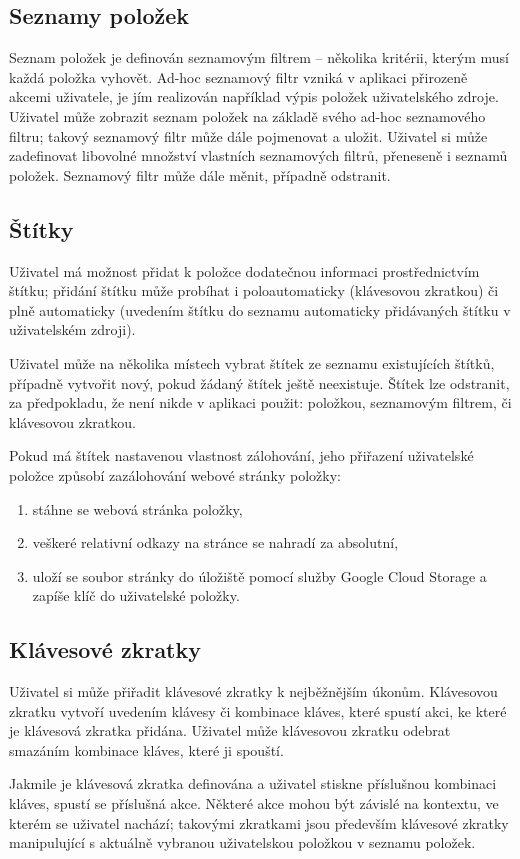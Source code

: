\subsection{Seznamy položek}

Seznam položek je definován seznamovým filtrem -- několika kritérii, kterým musí každá položka vyhovět.
Ad-hoc seznamový filtr vzniká v aplikaci přirozeně akcemi uživatele, je jím realizován například výpis položek uživatelského zdroje.
Uživatel může zobrazit seznam položek na základě svého ad-hoc seznamového filtru; takový seznamový filtr může dále pojmenovat a uložit.
Uživatel si může zadefinovat libovolné množství vlastních seznamových filtrů, přeneseně i seznamů položek.
Seznamový filtr může dále měnit, případně odstranit.

\subsection{Štítky}\label{ssec:procesy-stitky}

Uživatel má možnost přidat k položce dodatečnou informaci prostřednictvím štítku; přidání štítku může probíhat i poloautomaticky (klávesovou zkratkou) či plně automaticky (uvedením štítku do seznamu automaticky přidávaných štítku v uživatelském zdroji).

Uživatel může na několika místech vybrat štítek ze seznamu existujících štítků, případně vytvořit nový, pokud žádaný štítek ještě neexistuje.
Štítek lze odstranit, za předpokladu, že není nikde v aplikaci použit: položkou, seznamovým filtrem, či klávesovou zkratkou.

Pokud má štítek nastavenou vlastnost zálohování, jeho přiřazení uživatelské položce způsobí zazálohování webové stránky položky:
\begin{enumerate}
	\item stáhne se webová stránka položky,
	\item veškeré relativní odkazy na stránce se nahradí za absolutní,
	\item uloží se soubor stránky do úložiště pomocí služby Google Cloud Storage a zapíše klíč do uživatelské položky.
\end{enumerate}

\subsection{Klávesové zkratky}

Uživatel si může přiřadit klávesové zkratky k nejběžnějším úkonům.
Klávesovou zkratku vytvoří uvedením klávesy či kombinace kláves, které spustí akci, ke které je klávesová zkratka přidána.
Uživatel může klávesovou zkratku odebrat smazáním kombinace kláves, které ji spouští.

Jakmile je klávesová zkratka definována a uživatel stiskne příslušnou kombinaci kláves, spustí se příslušná akce.
Některé akce mohou být závislé na kontextu, ve kterém se uživatel nachází; takovými zkratkami jsou především klávesové zkratky manipulující s aktuálně vybranou uživatelskou položkou v seznamu položek.
